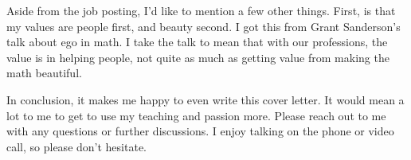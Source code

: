 \documentclass[11pt,a4paper,sans]{moderncv}        %
\begin{document}
Aside from the job posting, I'd like to mention a few
other things. First, is that my values are people first,
and beauty second. I got this from Grant Sanderson's talk
about ego in math.  I take the talk to mean that with our
professions, the value is in helping people, not quite as
much as getting value from making the math beautiful.

In conclusion, it makes me happy to even write this cover letter.
It would mean a lot to me to get to use my teaching
and passion more.
Please reach out to me with any questions or further
discussions. I enjoy talking on the phone or video call,
so please don't hesitate.


\vspace{0.5cm}


\makeletterclosing
\end{document}
